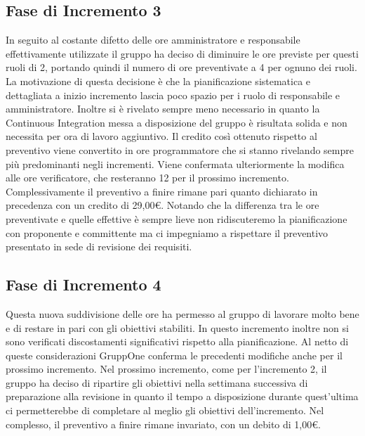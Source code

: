 \documentclass[../piano-di-progetto.tex]{subfiles}
\begin{document}
\subsection{Fase di Incremento 3}%
\label{sub:preventivo_a_finire/fase_di_incremento_3}

In seguito al costante difetto delle ore amministratore e responsabile effettivamente utilizzate il gruppo ha deciso di diminuire le ore previste per questi ruoli di 2, portando quindi il numero di ore preventivate a 4 per ognuno dei ruoli.
La motivazione di questa decisione è che la pianificazione sistematica e dettagliata a inizio incremento lascia poco spazio per i ruolo di responsabile e amministratore.
Inoltre si è rivelato sempre meno necessario in quanto la Continuous Integration messa a disposizione del gruppo è risultata solida e non necessita per ora di lavoro aggiuntivo.
Il credito così ottenuto rispetto al preventivo viene convertito in ore programmatore che si stanno rivelando sempre più predominanti negli incrementi.
Viene confermata ulteriormente la modifica alle ore verificatore, che resteranno 12 per il prossimo incremento.
Complessivamente il preventivo a finire rimane pari quanto dichiarato in precedenza con un credito di 29,00€.
Notando che la differenza tra le ore preventivate e quelle effettive è sempre lieve non ridiscuteremo la pianificazione con proponente e committente ma ci impegniamo a rispettare il preventivo presentato in sede di revisione dei requisiti.



\subsection{Fase di Incremento 4}%
\label{sub:preventivo_a_finire/fase_di_incremento_4}

Questa nuova suddivisione delle ore ha permesso al gruppo di lavorare molto bene e di restare in pari con gli obiettivi stabiliti.
In questo incremento inoltre non si sono verificati discostamenti significativi rispetto alla pianificazione.
Al netto di queste considerazioni GruppOne conferma le precedenti modifiche anche per il prossimo incremento.
Nel prossimo incremento, come per l'incremento 2, il gruppo ha deciso di ripartire gli obiettivi nella settimana successiva di preparazione alla revisione in quanto il tempo a disposizione durante quest'ultima ci permetterebbe di completare al meglio gli obiettivi dell'incremento.
Nel complesso, il preventivo a finire rimane invariato, con un debito di 1,00€.
\end{document}
